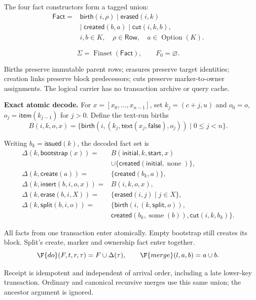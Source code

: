 The four fact constructors form a tagged union:
\[
\begin{aligned}
\mathsf{Fact}={}&\mathsf{birth}(i,\rho)\;|\;\mathsf{erased}(i,k)\\
&|\;\mathsf{created}(b,a)\;|\;\mathsf{cut}(i,k,b),\\
&i,b\in K,\quad \rho\in\mathsf{Row},\quad a\in\operatorname{Option}(K).
\end{aligned}
\]

\[
\Sigma=\operatorname{Finset}(\mathsf{Fact}),\qquad F_0=\varnothing.
\]

Births preserve immutable parent rows; erasures preserve target identities; creation links preserve block predecessors; cuts preserve marker-to-owner assignments. The logical carrier has no transaction archive or query cache.

\textbf{Exact atomic decode.} For $x=[x_0,\ldots,x_{n-1}]$, set $k_j=(c+j,u)$ and $o_0=o$, $o_j=\mathsf{item}(k_{j-1})$ for $j>0$. Define the text-run births
\[
B(i,k,o,x)=\{\mathsf{birth}(i,(k_j,\mathsf{text}(x_j,\mathsf{false}),o_j))\mid 0\le j<n\}.
\]

Writing $b_k=\mathsf{issued}(k)$, the decoded fact set is
\[
\begin{aligned}
\Delta(k,\mathsf{bootstrap}(x))={}&B(\mathsf{initial},k,\mathsf{start},x)\\
&\cup\{\mathsf{created}(\mathsf{initial},\operatorname{none})\},\\
\Delta(k,\mathsf{create}(a))={}&\{\mathsf{created}(b_k,a)\},\\
\Delta(k,\mathsf{insert}(b,i,o,x))={}&B(i,k,o,x),\\
\Delta(k,\mathsf{erase}(b,i,X))={}&\{\mathsf{erased}(i,j)\mid j\in X\},\\
\Delta(k,\mathsf{split}(b,i,o))={}&\{\mathsf{birth}(i,(k,\mathsf{split},o)),\\
&\mathsf{created}(b_k,\operatorname{some}(b)),\mathsf{cut}(i,k,b_k)\}.
\end{aligned}
\]

All facts from one transaction enter atomically. Empty bootstrap still creates its block. Split's create, marker and ownership fact enter together.
\[
\F{do}(F,t,r,\tau)=F\cup\Delta(\tau),\qquad\F{merge}(l,a,b)=a\cup b.
\]

Receipt is idempotent and independent of arrival order, including a late lower-key transaction. Ordinary and canonical recursive merges use this same union; the ancestor argument is ignored.

